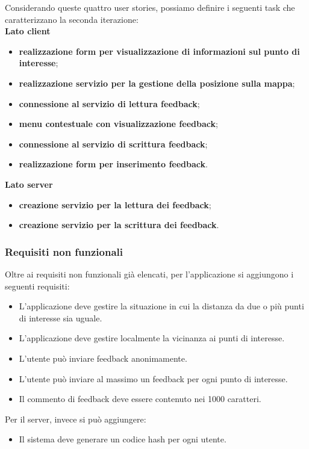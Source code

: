 Considerando queste quattro user stories, possiamo definire i seguenti task che caratterizzano la seconda iterazione:\\
\textbf{Lato client}
\begin{itemize}
\item \textbf{realizzazione form per visualizzazione di informazioni sul punto di interesse};
\item \textbf{realizzazione servizio per la gestione della posizione sulla mappa};
\item \textbf{connessione al servizio di lettura feedback};
\item \textbf{menu contestuale con visualizzazione feedback};
\item \textbf{connessione al servizio di scrittura feedback};
\item \textbf{realizzazione form per inserimento feedback}.
\end{itemize}

\textbf{Lato server}
\begin{itemize}
\item \textbf{creazione servizio per la lettura dei feedback};
\item \textbf{creazione servizio per la scrittura dei feedback}.
\end{itemize}


\subsubsection{Requisiti non funzionali}
Oltre ai requisiti non funzionali già elencati, per l'applicazione si aggiungono i seguenti requisiti:
\begin{itemize}
\item L'applicazione deve gestire la situazione in cui la distanza da due o più punti di interesse sia uguale.
\item L'applicazione deve gestire localmente la vicinanza ai punti di interesse.
\item L'utente può inviare feedback anonimamente.
\item L'utente può inviare al massimo un feedback per ogni punto di interesse.
\item Il commento di feedback deve essere contenuto nei 1000 caratteri.
\end{itemize}

Per il server, invece si può aggiungere:
\begin{itemize}
\item Il sistema deve generare un codice hash per ogni utente.
\end{itemize}



